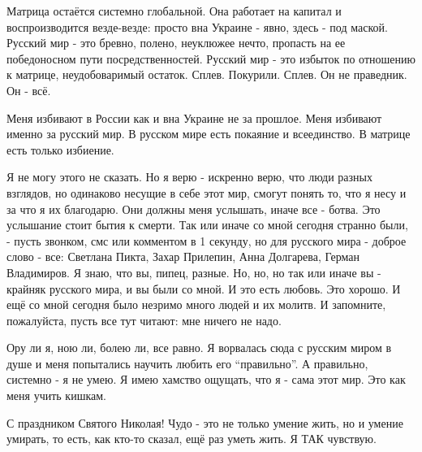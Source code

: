 Матрица остаётся системно глобальной. Она работает на капитал и воспроизводится
везде-везде: просто вна Украине - явно, здесь - под маской. Русский мир - это
бревно, полено, неуклюжее нечто, пропасть на ее победоносном пути
посредственностей. Русский мир - это избыток по отношению к матрице,
неудобоваримый остаток. Сплев. Покурили. Сплев. Он не праведник. Он - всё.

Меня избивают в России как и вна Украине не за прошлое. Меня избивают именно за
русский мир. В русском мире есть покаяние и всеединство. В матрице есть только
избиение.

Я не могу этого не сказать. Но я верю - искренно верю, что люди разных
взглядов, но одинаково несущие в себе этот мир, смогут понять то, что я несу и
за что я их благодарю. Они должны меня услышать, иначе все - ботва. Это
услышание стоит бытия к смерти. Так или иначе со мной сегодня странно были, -
пусть звонком, смс или комментом в 1 секунду, но для русского мира - доброе
слово - все: Светлана Пикта, Захар Прилепин, Анна Долгарева, Герман
Владимиров. Я знаю, что вы, пипец, разные. Но, но, но так или иначе вы -
крайняк русского мира, и вы были со мной. И это есть любовь. Это хорошо. И ещё
со мной сегодня было незримо много людей и их молитв. И запомните, пожалуйста,
пусть все тут читают: мне ничего не надо. 

Ору ли я, ною ли, болею ли, все равно. Я ворвалась сюда с русским миром в душе
и меня попытались научить любить его \enquote{правильно}. А правильно, системно - я не
умею. Я имею хамство ощущать, что я - сама этот мир. Это как меня учить кишкам. 

С праздником Святого Николая! Чудо - это не только умение жить, но и умение
умирать, то есть, как кто-то сказал, ещё раз уметь жить. Я ТАК чувствую.


